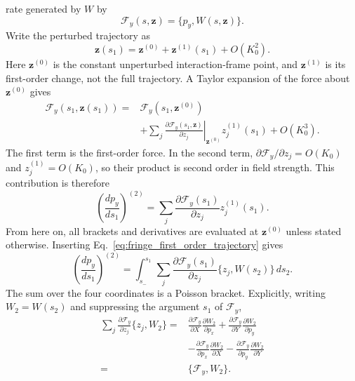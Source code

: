 rate generated by $W$ by
\begin{equation}
 \mathcal F_y(s,\mathbf z)=\{p_y,W(s,\mathbf z)\}.
\end{equation}
Write the perturbed trajectory as
\begin{equation}
 \mathbf z(s_1)=\mathbf z^{(0)}+\mathbf z^{(1)}(s_1)+O(K_0^2).
\end{equation}
Here $\mathbf z^{(0)}$ is the constant unperturbed interaction-frame point,
and $\mathbf z^{(1)}$ is its first-order change, not the full trajectory.
A Taylor expansion of the force about $\mathbf z^{(0)}$ gives
\begin{align}
 \mathcal F_y(s_1,\mathbf z(s_1))
 ={}&\mathcal F_y(s_1,\mathbf z^{(0)})\nonumber\\
 &+\sum_j\left.
       \frac{\partial\mathcal F_y(s_1,\mathbf z)}{\partial z_j}
       \right|_{\mathbf z^{(0)}}z_j^{(1)}(s_1)+O(K_0^3).
\end{align}
The first term is the first-order force. In the second term,
$\partial\mathcal F_y/\partial z_j=O(K_0)$ and $z_j^{(1)}=O(K_0)$,
so their product is second order in field strength. This contribution is
therefore
\begin{equation}
 \left(\frac{dp_y}{ds_1}\right)^{(2)}
 =\sum_j\frac{\partial\mathcal F_y(s_1)}{\partial z_j}
                  z_j^{(1)}(s_1).
\end{equation}
From here on, all brackets and derivatives are evaluated at
$\mathbf z^{(0)}$ unless stated otherwise. Inserting
Eq.~\eqref{eq:fringe_first_order_trajectory} gives
\begin{equation}
 \left(\frac{dp_y}{ds_1}\right)^{(2)}
 =\int_{s_-}^{s_1}\sum_j
   \frac{\partial\mathcal F_y(s_1)}{\partial z_j}
   \{z_j,W(s_2)\}\,ds_2.
\end{equation}
The sum over the four coordinates is a Poisson bracket. Explicitly, writing
$W_2=W(s_2)$ and suppressing the argument $s_1$ of $\mathcal F_y$,
\begin{align}
 \sum_j\frac{\partial\mathcal F_y}{\partial z_j}\{z_j,W_2\}
 ={}&\frac{\partial\mathcal F_y}{\partial X}\frac{\partial W_2}{\partial p_x}
    +\frac{\partial\mathcal F_y}{\partial Y}\frac{\partial W_2}{\partial p_y}
       \nonumber\\
   &-\frac{\partial\mathcal F_y}{\partial p_x}\frac{\partial W_2}{\partial X}
    -\frac{\partial\mathcal F_y}{\partial p_y}\frac{\partial W_2}{\partial Y}
       \nonumber\\
 ={}&\{\mathcal F_y,W_2\}.
\end{align}
